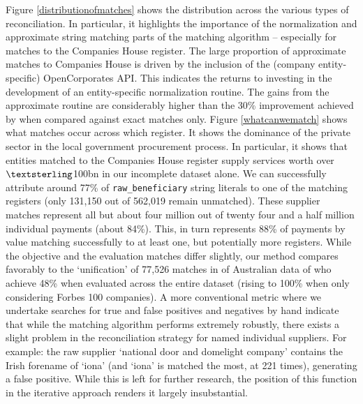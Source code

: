 \documentclass[11pt]{article}
\begin{document}
Figure \ref{distributionofmatches} shows the distribution across the various types of reconciliation. In particular, it highlights the importance of the normalization and approximate string matching parts of the matching algorithm -- especially for matches to the Companies House register. The large proportion of approximate matches to Companies House is driven by the inclusion of the (company entity-specific) OpenCorporates API. This indicates the returns to investing in the development of an entity-specific normalization routine. The gains from the approximate routine are considerably higher than the 30\% improvement achieved by \cite{imai2017} when compared against exact matches only. Figure \ref{whatcanwematch} shows what matches occur across which register. It shows the dominance of the private sector in the local government procurement process. In particular, it shows that entities matched to the Companies House register supply services worth over $\textsterling$100bn in our incomplete dataset alone.  We can successfully attribute around 77\% of \texttt{raw\_beneficiary} string literals to one of the matching registers (only 131,150 out of 562,019 remain unmatched). These supplier matches represent all but about four million out of twenty four and a half million individual payments (about 84\%). This, in turn represents 88\% of payments by value matching successfully to at least one, but potentially more registers. While the objective and the evaluation matches differ slightly, our method compares favorably to the `unification' of 77,526 matches in of Australian data of  \cite{corfu2015} who achieve 48\% when evaluated across the entire dataset (rising to 100\% when only considering Forbes 100 companies). A more conventional metric where we undertake searches for true and false positives and negatives by hand indicate that while the matching algorithm performs extremely robustly, there exists a slight problem in the reconciliation strategy for named individual suppliers. For example: the raw supplier `national door and domelight company' contains the Irish forename of `iona' (and `iona' is matched the most, at 221 times), generating a false positive. While this is left for further research, the position of this function in the iterative approach renders it largely insubstantial.
\end{document}
